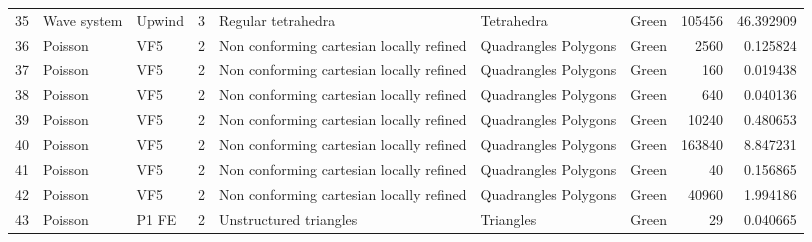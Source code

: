 \begin{tabular}{lllrlllrr}
35  &       Wave system &                         Upwind &               3 &                        Regular tetrahedra &             Tetrahedra  &                                Green &                   105456 &                        46.392909 \\
36  &           Poisson &                            VF5 &               2 &  Non conforming cartesian locally refined &   Quadrangles Polygons  &                                Green &                     2560 &                         0.125824 \\
37  &           Poisson &                            VF5 &               2 &  Non conforming cartesian locally refined &   Quadrangles Polygons  &                                Green &                      160 &                         0.019438 \\
38  &           Poisson &                            VF5 &               2 &  Non conforming cartesian locally refined &   Quadrangles Polygons  &                                Green &                      640 &                         0.040136 \\
39  &           Poisson &                            VF5 &               2 &  Non conforming cartesian locally refined &   Quadrangles Polygons  &                                Green &                    10240 &                         0.480653 \\
40  &           Poisson &                            VF5 &               2 &  Non conforming cartesian locally refined &   Quadrangles Polygons  &                                Green &                   163840 &                         8.847231 \\
41  &           Poisson &                            VF5 &               2 &  Non conforming cartesian locally refined &   Quadrangles Polygons  &                                Green &                       40 &                         0.156865 \\
42  &           Poisson &                            VF5 &               2 &  Non conforming cartesian locally refined &   Quadrangles Polygons  &                                Green &                    40960 &                         1.994186 \\
43  &           Poisson &                          P1 FE &               2 &                    Unstructured triangles &              Triangles  &                                Green &                       29 &                         0.040665 \\

\end{tabular}
